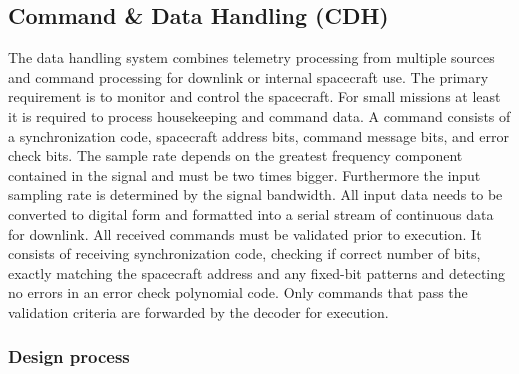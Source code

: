 \subsection{Command \& Data Handling (CDH)}

The data handling system combines telemetry processing from multiple sources and
command processing for downlink or internal spacecraft use. The primary requirement
is to monitor and control the spacecraft. For small missions at least it is
required to process housekeeping and command data.
A command consists of a synchronization code, spacecraft address bits, command
message bits, and error check bits. The sample rate depends on the greatest
frequency component contained in the signal and must be two times bigger.
Furthermore the input sampling rate is determined by the signal bandwidth.
All input data needs to be converted to digital form and formatted into a
serial stream of continuous data for downlink.
All received commands must be validated prior to execution. It consists of
receiving synchronization code, checking if correct number of bits, exactly
matching the spacecraft address and any fixed-bit patterns and detecting no errors
in an error check polynomial code. Only commands that pass the validation criteria
are forwarded by the decoder for execution.

\subsubsection{Design process}

